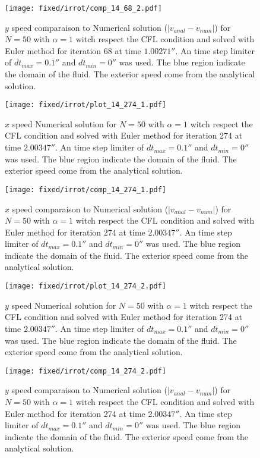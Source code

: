 \begin{figure}
\texttt{[image: fixed/irrot/comp\_14\_68\_2.pdf]}
\caption{$y$ speed comparaison to Numerical solution ($|v_{anal}-v_{num}|$) for $N=50$ with $\alpha=1$ witch respect the CFL condition and solved with Euler method
for iteration 68 at time $\unit{1.00271}{\second}$.
An time step limiter of $dt_{max}=\unit{0.1}{\second}$ and $dt_{min}=\unit{0}{\second}$ was used.
The blue region indicate the domain of the fluid. The exterior speed come from the analytical solution.
\label{fix:comp_14_68_2}
}
\end{figure}

\clearpage


\begin{figure}
\texttt{[image: fixed/irrot/plot\_14\_274\_1.pdf]}
\caption{$x$ speed Numerical solution for $N=50$ with $\alpha=1$ witch respect the CFL condition and solved with Euler method
for iteration 274 at time $\unit{2.00347}{\second}$.
An time step limiter of $dt_{max}=\unit{0.1}{\second}$ and $dt_{min}=\unit{0}{\second}$ was used.
The blue region indicate the domain of the fluid. The exterior speed come from the analytical solution.
\label{fix:plot_14_274_1}
}
\end{figure}

\begin{figure}
\texttt{[image: fixed/irrot/comp\_14\_274\_1.pdf]}
\caption{$x$ speed comparaison to Numerical solution ($|v_{anal}-v_{num}|$) for $N=50$ with $\alpha=1$ witch respect the CFL condition and solved with Euler method
for iteration 274 at time $\unit{2.00347}{\second}$.
An time step limiter of $dt_{max}=\unit{0.1}{\second}$ and $dt_{min}=\unit{0}{\second}$ was used.
The blue region indicate the domain of the fluid. The exterior speed come from the analytical solution.
\label{fix:comp_14_274_1}
}
\end{figure}

\begin{figure}
\texttt{[image: fixed/irrot/plot\_14\_274\_2.pdf]}
\caption{$y$ speed Numerical solution for $N=50$ with $\alpha=1$ witch respect the CFL condition and solved with Euler method
for iteration 274 at time $\unit{2.00347}{\second}$.
An time step limiter of $dt_{max}=\unit{0.1}{\second}$ and $dt_{min}=\unit{0}{\second}$ was used.
The blue region indicate the domain of the fluid. The exterior speed come from the analytical solution.
\label{fix:plot_14_274_2}
}
\end{figure}

\begin{figure}
\texttt{[image: fixed/irrot/comp\_14\_274\_2.pdf]}
\caption{$y$ speed comparaison to Numerical solution ($|v_{anal}-v_{num}|$) for $N=50$ with $\alpha=1$ witch respect the CFL condition and solved with Euler method
for iteration 274 at time $\unit{2.00347}{\second}$.
An time step limiter of $dt_{max}=\unit{0.1}{\second}$ and $dt_{min}=\unit{0}{\second}$ was used.
The blue region indicate the domain of the fluid. The exterior speed come from the analytical solution.
\label{fix:comp_14_274_2}
}
\end{figure}


